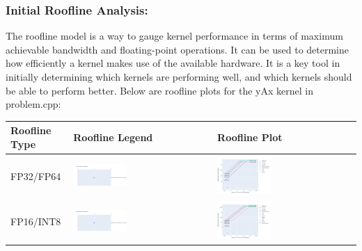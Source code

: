 \documentclass[
]{article}
\begin{document}
\hypertarget{initial-roofline-analysis}{%
\subsubsection{Initial Roofline
Analysis:}\label{initial-roofline-analysis}}

The roofline model is a way to gauge kernel performance in terms of
maximum achievable bandwidth and floating-point operations. It can be
used to determine how efficiently a kernel makes use of the available
hardware. It is a key tool in initially determining which kernels are
performing well, and which kernels should be able to perform better.
Below are roofline plots for the yAx kernel in problem.cpp:

\begin{longtable}[]{@{}lll@{}}
\toprule
Roofline Type & Roofline Legend & Roofline Plot\tabularnewline
\midrule
\endhead
FP32/FP64 &
\includegraphics[width=0.4\textwidth,height=0.4\textheight]{omniperf/launch_parameters/8575851bf3f9ac056a2eae0e721d44cde6e9378a.png} &
\includegraphics[width=0.4\textwidth,height=0.4\textheight]{omniperf/launch_parameters/1c1e7ac9bcf47ad1d9ab16625d90a45bcc6dc51f.png}\tabularnewline
FP16/INT8 &
\includegraphics[width=0.4\textwidth,height=0.4\textheight]{omniperf/launch_parameters/8575851bf3f9ac056a2eae0e721d44cde6e9378a.png} &
\includegraphics[width=0.4\textwidth,height=0.4\textheight]{omniperf/launch_parameters/aeb466a8cd337877bd21ecfe9b9a109f5a42050b.png}\tabularnewline
\bottomrule
\end{longtable}
\end{document}
